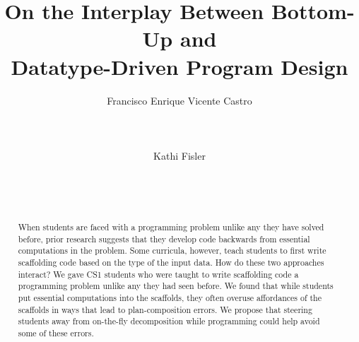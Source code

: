 \documentclass{sig-alternate-05-2015}
\begin{document}

\title{On the Interplay Between Bottom-Up and \\ Datatype-Driven Program Design}


\author{
\alignauthor
Francisco Enrique Vicente Castro\\
       \\
       \\
       \\
\alignauthor
Kathi Fisler\\
       \\
       \\
       \\
}

\maketitle
\begin{abstract}
When students are faced with a programming problem unlike any they have solved before, prior research suggests that they develop code backwards from essential computations in the problem.  Some curricula, however, teach students to first write scaffolding code based on the type of the input data.  How do these two approaches interact?  We gave CS1 students who were taught to write scaffolding code a programming problem unlike any they had seen before.  We found that while students
put essential computations into the scaffolds, they often overuse affordances of the scaffolds in ways that lead to plan-composition errors. We propose that steering students away from on-the-fly decomposition while programming could help avoid some of these errors.
\end{abstract}


\end{document}
